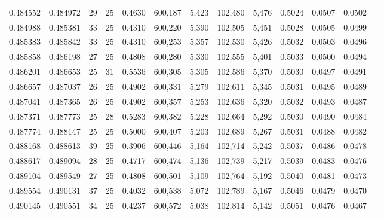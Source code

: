 \begin{tabular}{rrrrrrrrrrrrr}
0.484552 & 0.484972 &    29 &  25 &                                     0.4630 & 600,187 &   5,423 & 102,480 &   5,476 & 0.5024 & 0.0507 & 0.0502 \\
0.484988 & 0.485381 &    33 &  25 &                                     0.4310 & 600,220 &   5,390 & 102,505 &   5,451 & 0.5028 & 0.0505 & 0.0499 \\
0.485383 & 0.485842 &    33 &  25 &                                     0.4310 & 600,253 &   5,357 & 102,530 &   5,426 & 0.5032 & 0.0503 & 0.0496 \\
0.485858 & 0.486198 &    27 &  25 &                                     0.4808 & 600,280 &   5,330 & 102,555 &   5,401 & 0.5033 & 0.0500 & 0.0494 \\
0.486201 & 0.486653 &    25 &  31 &                                     0.5536 & 600,305 &   5,305 & 102,586 &   5,370 & 0.5030 & 0.0497 & 0.0491 \\
0.486657 & 0.487037 &    26 &  25 &                                     0.4902 & 600,331 &   5,279 & 102,611 &   5,345 & 0.5031 & 0.0495 & 0.0489 \\
0.487041 & 0.487365 &    26 &  25 &                                     0.4902 & 600,357 &   5,253 & 102,636 &   5,320 & 0.5032 & 0.0493 & 0.0487 \\
0.487371 & 0.487773 &    25 &  28 &                                     0.5283 & 600,382 &   5,228 & 102,664 &   5,292 & 0.5030 & 0.0490 & 0.0484 \\
0.487774 & 0.488147 &    25 &  25 &                                     0.5000 & 600,407 &   5,203 & 102,689 &   5,267 & 0.5031 & 0.0488 & 0.0482 \\
0.488168 & 0.488613 &    39 &  25 &                                     0.3906 & 600,446 &   5,164 & 102,714 &   5,242 & 0.5037 & 0.0486 & 0.0478 \\
0.488617 & 0.489094 &    28 &  25 &                                     0.4717 & 600,474 &   5,136 & 102,739 &   5,217 & 0.5039 & 0.0483 & 0.0476 \\
0.489104 & 0.489549 &    27 &  25 &                                     0.4808 & 600,501 &   5,109 & 102,764 &   5,192 & 0.5040 & 0.0481 & 0.0473 \\
0.489554 & 0.490131 &    37 &  25 &                                     0.4032 & 600,538 &   5,072 & 102,789 &   5,167 & 0.5046 & 0.0479 & 0.0470 \\
0.490145 & 0.490551 &    34 &  25 &                                     0.4237 & 600,572 &   5,038 & 102,814 &   5,142 & 0.5051 & 0.0476 & 0.0467 \\

\end{tabular}
